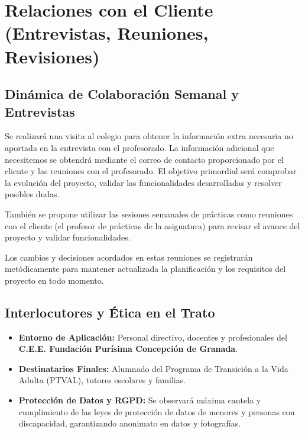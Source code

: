 \section{Relaciones con el Cliente (Entrevistas, Reuniones, Revisiones)}

\subsection{Dinámica de Colaboración Semanal y Entrevistas}
Se realizará una visita al colegio para obtener la información extra necesaria no aportada en la entrevista con el profesorado. La información adicional que necesitemos se obtendrá mediante el correo de contacto proporcionado por el cliente y las reuniones con el profesorado. El objetivo primordial será comprobar la evolución del proyecto, validar las funcionalidades desarrolladas y resolver posibles dudas.  

También se propone utilizar las sesiones semanales de prácticas como reuniones con el cliente (el profesor de prácticas de la asignatura) para revisar el avance del proyecto y validar funcionalidades.

Los cambios y decisiones acordados en estas reuniones se registrarán metódicamente para mantener actualizada la planificación y los requisitos del proyecto en todo momento.

\subsection{Interlocutores y Ética en el Trato}
\begin{itemize}[leftmargin=*]
  \item \textbf{Entorno de Aplicación:} Personal directivo, docentes y profesionales del \textbf{C.E.E. Fundación Purísima Concepción de Granada}.
  \item \textbf{Destinatarios Finales:} Alumnado del Programa de Transición a la Vida Adulta (PTVAL), tutores escolares y familias.
  \item \textbf{Protección de Datos y RGPD:} Se observará máxima cautela y cumplimiento de las leyes de protección de datos de menores y personas con discapacidad, garantizando anonimato en datos y fotografías.
\end{itemize}
